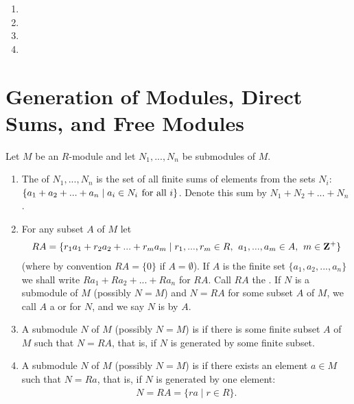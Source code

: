     \begin{definition}\label{def:module-iso-thms}
        \phantom{a}
        \begin{enumerate}[label = (\arabic*)]
            \item 
            \item
            \item 
            \item
        \end{enumerate}
    \end{definition}

\section{Generation of Modules, Direct Sums, and Free Modules}
    \begin{definition}\label{def:-properties-module-sums}
        Let $M$ be an $R$-module and let $N_1,...,N_n$ be submodules of $M$.
        \begin{enumerate}[label = (\arabic*)]
            \item The  of $N_1,...,N_n$ is the set of all finite sums of elements from the sets $N_i$: $\{a_1 + a_2 + ... + a_n \mid a_i \in N_i \hskip0.4em\relax \text{for all }i\}$. Denote this sum by $N_1 + N_2 + ... + N_n$.
            \item For any subset $A$ of $M$ let
            \begin{equation*}
            \begin{split}
                RA = \{r_1 a_1 + r_2 a_2 + ... + r_m a_m \mid r_1,...,r_m \in R,\hskip0.4em\relax a_1,...,a_m \in A,\hskip0.4em\relax m \in \mathbf{Z}^{+}\}
            \end{split}
            \end{equation*}
            (where by convention $RA = \{0\}$ if $A = \emptyset$). If $A$ is the finite set $\{a_1,a_2,...,a_n\}$ we shall write $Ra_1 + Ra_2 + ... + Ra_n$ for $RA$. Call $RA$ the . If $N$ is a submodule of $M$ (possibly $N = M$) and $N=RA$ for some subset $A$ of $M$, we call $A$ a  or  for $N$, and we say $N$ is  by $A$.
            \item A submodule $N$ of $M$ (possibly $N=M$) is  if there is some finite subset $A$ of $M$ such that $N = RA$, that is, if $N$ is generated by some finite subset.
            \item A submodule $N$ of $M$ (possibly $N=M$) is  if there exists an element $a \in M$ such that $N = Ra$, that is, if $N$ is generated by one element:
            \begin{equation*}
            \begin{split}
                N = RA = \{ra \mid r \in R\}.
            \end{split}
            \end{equation*}
        \end{enumerate}
    \end{definition}

